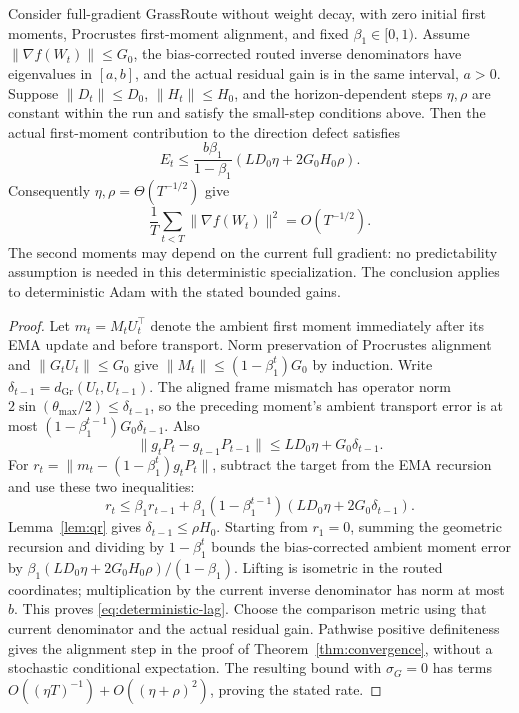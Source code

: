 \begin{corollary}
\label{cor:deterministic-adam}
Consider full-gradient GrassRoute without weight decay, with zero initial
first moments, Procrustes first-moment alignment, and fixed
$\beta_1\in[0,1)$. Assume $\|\nabla f(W_t)\|\le G_0$, the
bias-corrected routed inverse denominators have eigenvalues in $[a,b]$,
and the actual residual gain is in the same interval, $a>0$.
Suppose $\|D_t\|\le D_0$, $\|H_t\|\le H_0$, and the horizon-dependent
steps $\eta,\rho$ are constant within the run and satisfy the small-step
conditions above. Then the actual first-moment contribution to the
direction defect satisfies
\begin{equation}
 E_t\le \frac{b\beta_1}{1-\beta_1}
                 (LD_0\eta+2G_0H_0\rho).\label{eq:deterministic-lag}
\end{equation}
Consequently $\eta,\rho=\Theta(T^{-1/2})$ give
\begin{equation}
 \frac1T\sum_{t<T}\|\nabla f(W_t)\|^2=O(T^{-1/2}).
\end{equation}
The second moments may depend on the current full gradient: no
predictability assumption is needed in this deterministic specialization.
The conclusion applies to deterministic Adam with the stated bounded gains.
\end{corollary}
\begin{proof}
Let $m_t=M_tU_t^\top$ denote the ambient first moment immediately after
its EMA update and before transport. Norm preservation of Procrustes
alignment and $\|G_tU_t\|\le G_0$ give
$\|M_t\|\le(1-\beta_1^t)G_0$ by induction.
Write $\delta_{t-1}=d_{\mathrm{Gr}}(U_t,U_{t-1})$.
The aligned frame mismatch has operator norm
$2\sin(\theta_{\max}/2)\le\delta_{t-1}$, so the preceding moment's
ambient transport error is at most
$(1-\beta_1^{t-1})G_0\delta_{t-1}$.
Also
\begin{equation}
 \|g_tP_t-g_{t-1}P_{t-1}\|
 \le LD_0\eta+G_0\delta_{t-1}.
\end{equation}
For $r_t=\|m_t-(1-\beta_1^t)g_tP_t\|$, subtract the target from the
EMA recursion and use these two inequalities:
\begin{equation}
 r_t\le\beta_1r_{t-1}
 +\beta_1(1-\beta_1^{t-1})(LD_0\eta+2G_0\delta_{t-1}).
\end{equation}
Lemma~\ref{lem:qr} gives $\delta_{t-1}\le\rho H_0$.
Starting from $r_1=0$, summing the geometric recursion and dividing by
$1-\beta_1^t$ bounds the bias-corrected ambient moment error by
$\beta_1(LD_0\eta+2G_0H_0\rho)/(1-\beta_1)$.
Lifting is isometric in the routed coordinates; multiplication by the
current inverse denominator has norm at most $b$. This proves
\eqref{eq:deterministic-lag}. Choose the comparison metric using that
current denominator and the actual residual gain. Pathwise positive
definiteness gives the alignment step in the proof of
Theorem~\ref{thm:convergence}, without a stochastic conditional
expectation. The resulting bound with $\sigma_G=0$ has terms
$O((\eta T)^{-1})+O((\eta+\rho)^2)$, proving the stated rate.
\end{proof}

